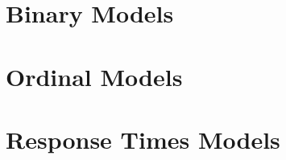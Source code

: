 \documentclass[article]{jss}
\begin{document}
\hypertarget{binary-models}{%
\section{Binary Models}\label{binary-models}}

\hypertarget{ordinal-models}{%
\section{Ordinal Models}\label{ordinal-models}}

\hypertarget{response-times-models}{%
\section{Response Times Models}\label{response-times-models}}

\renewcommand\refname{Conclusion}

\end{document}
